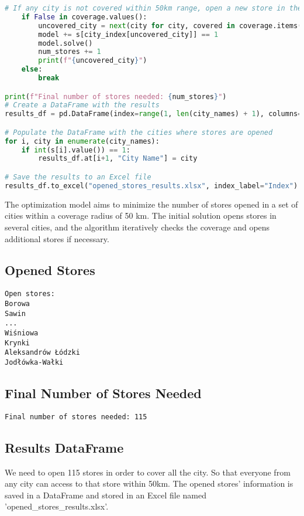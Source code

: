 \begin{center}
\begin{lstlisting}[language=Python, caption=Minimize the store opening within 50km in every city of poland]
    # If any city is not covered within 50km range, open a new store in the uncovered city
    if False in coverage.values():
        uncovered_city = next(city for city, covered in coverage.items() if not covered)
        model += s[city_index[uncovered_city]] == 1
        model.solve()
        num_stores += 1
        print(f"{uncovered_city}")
    else:
        break

print(f"Final number of stores needed: {num_stores}")
# Create a DataFrame with the results
results_df = pd.DataFrame(index=range(1, len(city_names) + 1), columns=["City Name"])

# Populate the DataFrame with the cities where stores are opened
for i, city in enumerate(city_names):
    if int(s[i].value()) == 1:
        results_df.at[i+1, "City Name"] = city

# Save the results to an Excel file
results_df.to_excel("opened_stores_results.xlsx", index_label="Index")


    \end{lstlisting}
\end{center}


The optimization model aims to minimize the number of stores opened in a set of cities within a coverage radius of 50 km. The initial solution opens stores in several cities, and the algorithm iteratively checks the coverage and opens additional stores if necessary.

\subsection*{Opened Stores}

\begin{verbatim}
Open stores:
Borowa
Sawin
...
Wiśniowa
Krynki
Aleksandrów Łódzki
Jodłówka-Wałki
\end{verbatim}

\subsection*{Final Number of Stores Needed}

\begin{verbatim}
Final number of stores needed: 115
\end{verbatim}

\subsection*{Results DataFrame}
We need to open 115 stores in order to cover all the city.
So that everyone from any city can access to that store within 50km. The opened stores' information is saved in a DataFrame and stored in an Excel file named 'opened\_stores\_results.xlsx'.
